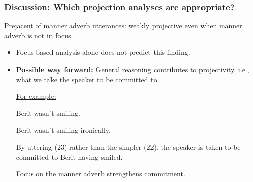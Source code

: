 \documentclass[pdf,xcolor=table,envcountsect,handout]{beamer}
\begin{document}
\begin{frame}
\frametitle{Discussion: Which projection analyses are appropriate?}


Prejacent of manner adverb utterances: weakly projective even when manner adverb is not in focus.

\pause

\begin{itemize}

\item Focus-based analysis alone does not predict this finding. 

\pause

\medskip

\item {\bf Possible way forward:} General reasoning contributes to projectivity, i.e., what we take the speaker to be committed to.

\vspace*{.6cm}
\pause

\underline{For example:}

\begin{exe}
 Berit wasn't smiling.

 Berit wasn't smiling ironically.
\end{exe}

By uttering (23) rather than the simpler (22), the speaker is taken to be committed to Berit having smiled.

Focus on the manner adverb strengthens commitment.



\end{itemize}

\end{frame}
\end{document}
